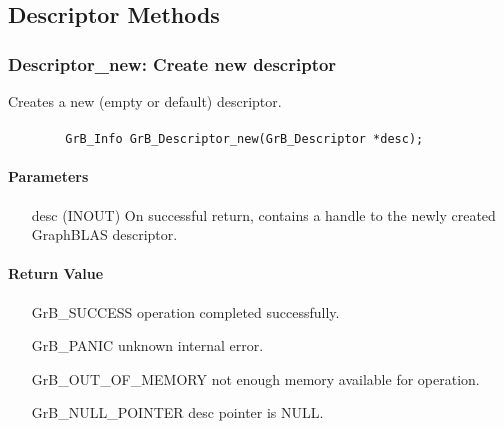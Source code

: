 \subsection{Descriptor Methods}

\subsubsection{{\sf Descriptor\_new}: Create new descriptor}

Creates a new (empty or default) descriptor.

\paragraph{\syntax}

\begin{verbatim}
        GrB_Info GrB_Descriptor_new(GrB_Descriptor *desc);
\end{verbatim}

\paragraph{Parameters}

\begin{itemize}[leftmargin=1.1in]
    \item[{\sf desc}] ({\sf INOUT}) On successful return, contains a 
    handle to the newly created GraphBLAS descriptor.
\end{itemize}

\paragraph{Return Value}

\begin{itemize}[leftmargin=2.1in]
\item[{\sf GrB\_SUCCESS}]           operation completed successfully.
\item[{\sf GrB\_PANIC}]             unknown internal error.
\item[{\sf GrB\_OUT\_OF\_MEMORY}]          not enough memory available for operation.
\item[{\sf GrB\_NULL\_POINTER}]    {\sf desc} pointer is {\sf NULL}.
\end{itemize}

